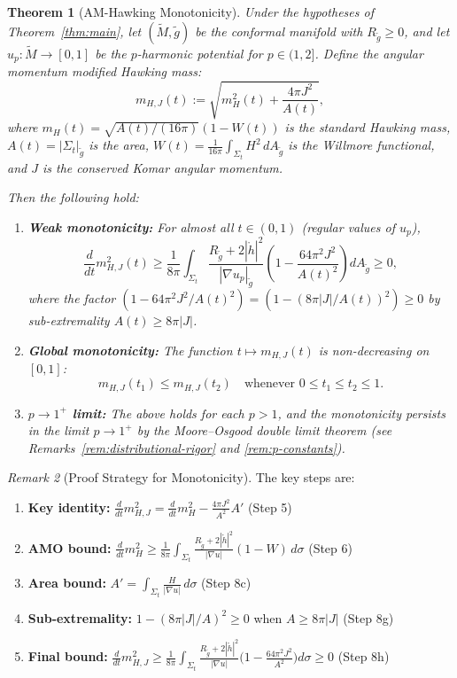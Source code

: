 \documentclass[12pt]{article}
\theoremstyle{plain}
\newtheorem{theorem}{Theorem}[section]
\theoremstyle{definition}
\theoremstyle{remark}
\newtheorem{remark}[theorem]{Remark}
\newcommand{\tM}{\tilde{M}}
\newcommand{\tg}{\tilde{g}}
\begin{document}
\begin{theorem}[AM-Hawking Monotonicity]\label{thm:monotone}
Under the hypotheses of Theorem~\ref{thm:main}, let $(\tM, \tg)$ be the conformal manifold with $R_{\tg} \geq 0$, and let $u_p: \tM \to [0,1]$ be the $p$-harmonic potential for $p \in (1,2]$. Define the angular momentum modified Hawking mass:
\[
m_{H,J}(t) := \sqrt{m_H^2(t) + \frac{4\pi J^2}{A(t)}},
\]
where $m_H(t) = \sqrt{A(t)/(16\pi)}(1 - W(t))$ is the standard Hawking mass, $A(t) = |\Sigma_t|_{\tg}$ is the area, $W(t) = \frac{1}{16\pi}\int_{\Sigma_t} H^2 \, dA_{\tg}$ is the Willmore functional, and $J$ is the conserved Komar angular momentum.

Then the following hold:
\begin{enumerate}[label=\textup{(\roman*)}]
    \item \textbf{Weak monotonicity:} For almost all $t \in (0,1)$ (regular values of $u_p$),
    \[
    \frac{d}{dt} m_{H,J}^2(t) \geq \frac{1}{8\pi}\int_{\Sigma_t} \frac{R_{\tg} + 2|\mathring{h}|^2}{|\nabla u_p|_{\tg}} \left(1 - \frac{64\pi^2 J^2}{A(t)^2}\right) dA_{\tg} \geq 0,
    \]
    where the factor $(1 - 64\pi^2 J^2/A(t)^2) = (1 - (8\pi|J|/A(t))^2) \geq 0$ by sub-extremality $A(t) \geq 8\pi|J|$.
    \item \textbf{Global monotonicity:} The function $t \mapsto m_{H,J}(t)$ is non-decreasing on $[0,1]$:
    \[
    m_{H,J}(t_1) \leq m_{H,J}(t_2) \quad \text{whenever } 0 \leq t_1 \leq t_2 \leq 1.
    \]
    \item \textbf{$p \to 1^+$ limit:} The above holds for each $p > 1$, and the monotonicity persists in the limit $p \to 1^+$ by the Moore--Osgood double limit theorem \cite{rudin1976} (see Remarks~\ref{rem:distributional-rigor} and \ref{rem:p-constants}).
\end{enumerate}
\end{theorem}

\begin{remark}[Proof Strategy for Monotonicity]\label{rem:proof-strategy}
The key steps are:
\begin{enumerate}
    \item[\textbf{(A)}] \textbf{Key identity:} $\frac{d}{dt}m_{H,J}^2 = \frac{d}{dt}m_H^2 - \frac{4\pi J^2}{A^2}A'$ \hfill (Step 5)
    \item[\textbf{(B)}] \textbf{AMO bound:} $\frac{d}{dt}m_H^2 \geq \frac{1}{8\pi}\int_{\Sigma_t}\frac{R_{\tg}+2|\mathring{h}|^2}{|\nabla u|}(1-W)\,d\sigma$ \hfill (Step 6)
    \item[\textbf{(C)}] \textbf{Area bound:} $A' = \int_{\Sigma_t}\frac{H}{|\nabla u|}\,d\sigma$ \hfill (Step 8c)
    \item[\textbf{(D)}] \textbf{Sub-extremality:} $1 - (8\pi|J|/A)^2 \geq 0$ when $A\geq 8\pi|J|$ \hfill (Step 8g)
    \item[\textbf{(E)}] \textbf{Final bound:} $\frac{d}{dt}m_{H,J}^2 \geq \frac{1}{8\pi}\int_{\Sigma_t}\frac{R_{\tg}+2|\mathring{h}|^2}{|\nabla u|}\bigl(1-\frac{64\pi^2 J^2}{A^2}\bigr)d\sigma \geq 0$ \hfill (Step 8h)
\end{enumerate}
\end{remark}
\end{document}
